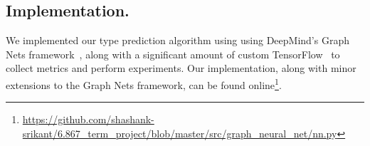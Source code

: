\subsection{Implementation.}

We implemented our type prediction algorithm using using DeepMind's Graph Nets framework~\cite{deepmind2018graph}, along with a significant amount of custom TensorFlow~\cite{google2015tensorflow} to collect metrics and perform experiments.
Our implementation, along with minor extensions to the Graph Nets framework, can be found online\footnote{\url{https://github.com/shashank-srikant/6.867_term_project/blob/master/src/graph_neural_net/nn.py}}.